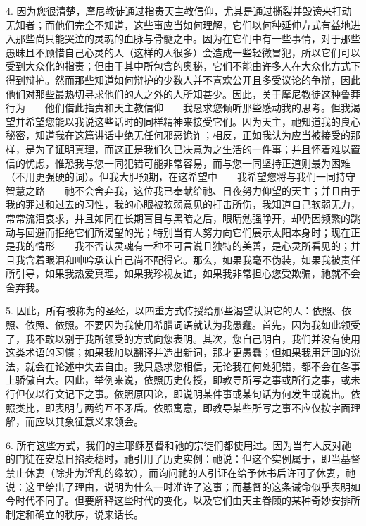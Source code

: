 4. 因为您很清楚，摩尼教徒通过指责天主教信仰，尤其是通过撕裂并毁谤来打动无知者；而他们完全不知道，这些事应当如何理解，它们以何种延伸方式有益地进入那些尚只能哭泣的灵魂的血脉与骨髓之中。因为在它们中有一些事情，对于那些愚昧且不顾惜自己心灵的人（这样的人很多）会造成一些轻微冒犯，所以它们可以受到大众化的指责；但由于其中所包含的奥秘，它们不能由许多人在大众化方式下得到辩护。然而那些知道如何辩护的少数人并不喜欢公开且多受议论的争辩，因此他们对那些最热切寻求他们的人之外的人所知甚少。因此，关于摩尼教徒这种鲁莽行为——他们借此指责和天主教信仰——我恳求您倾听那些感动我的思考。但我渴望并希望您能以我说这些话时的同样精神来接受它们。因为天主，祂知道我的良心秘密，知道我在这篇讲话中绝无任何邪恶诡诈；相反，正如我认为应当被接受的那样，是为了证明真理，而这正是我们久已决意为之生活的一件事；并且怀着难以置信的忧虑，惟恐我与您一同犯错可能非常容易，而与您一同坚持正道则最为困难（不用更强硬的词）。但我大胆预期，在这希望中——我希望您将与我们一同持守智慧之路——祂不会舍弃我，这位我已奉献给祂、日夜努力仰望的天主；并且由于我的罪过和过去的习性，我的心眼被软弱意见的打击所伤，我知道自己软弱无力，常常流泪哀求，并且如同在长期盲目与黑暗之后，眼睛勉强睁开，却仍因频繁的跳动与回避而拒绝它们所渴望的光；特别当有人努力向它们展示太阳本身时；现在正是我的情形——我不否认灵魂有一种不可言说且独特的美善，是心灵所看见的；并且我含着眼泪和呻吟承认自己尚不配得它。那么，如果我毫不伪装，如果我被责任所引导，如果我热爱真理，如果我珍视友谊，如果我非常担心您受欺骗，祂就不会舍弃我。\par

5. 因此，所有被称为的圣经，以四重方式传授给那些渴望认识它的人：依照、依照、依照、依照。不要因为我使用希腊词语就认为我愚蠢。首先，因为我如此领受了，我不敢以别于我所领受的方式向您表明。其次，您自己明白，我们并没有使用这类术语的习惯；如果我加以翻译并造出新词，那才更愚蠢；但如果我用迂回的说法，就会在论述中失去自由。我只恳求您相信，无论我在何处犯错，都不会在各事上骄傲自大。因此，举例来说，依照历史传授，即教导所写之事或所行之事，或未行但仅以行文记下之事。依照原因论，即说明某件事或某句话为何发生或说出。依照类比，即表明与两约互不矛盾。依照寓意，即教导某些所写之事不应仅按字面理解，而应以其象征意义来领会。\par

6. 所有这些方式，我们的主耶稣基督和祂的宗徒们都使用过。因为当有人反对祂的门徒在安息日掐麦穗时，祂引用了历史实例：祂说：但这个实例属于，即当基督禁止休妻（除非为淫乱的缘故），而询问祂的人引证在给予休书后许可了休妻，祂说：这里给出了理由，说明为什么一时准许了这事；而基督的这条诫命似乎表明如今时代不同了。但要解释这些时代的变化，以及它们由天主眷顾的某种奇妙安排所制定和确立的秩序，说来话长。\par

